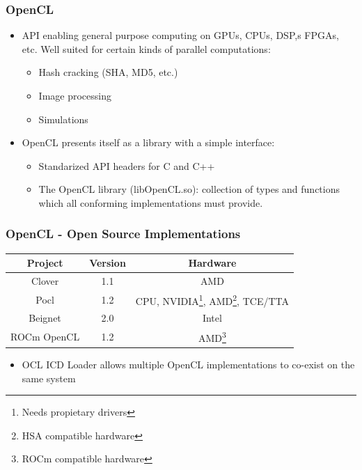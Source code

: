 \documentclass{beamer}
\begin{document}
\begin{frame}
\frametitle{OpenCL}
\begin{itemize}
  \item API enabling general purpose computing on GPUs, CPUs, DSP,s FPGAs, etc.
  Well suited for certain kinds of parallel computations:
  \begin{itemize}
    \item Hash cracking (SHA, MD5, etc.)
    \item Image processing
    \item Simulations
  \end{itemize}
  \item OpenCL presents itself as a library with a simple interface:
  \begin{itemize}
    \item Standarized API headers for C and C++
    \item The OpenCL library (libOpenCL.so): collection of types and functions
    which all conforming implementations must provide.
  \end{itemize}
\end{itemize}
\end{frame}

\begin{frame}
\frametitle{OpenCL - Open Source Implementations}
\centering
{
\begin{tabular}{c|c|c}
\textbf{Project} & \textbf{Version} & \textbf{Hardware} \\
\hline
Clover & 1.1 & AMD\\
Pocl & 1.2 & CPU, NVIDIA\footnote{Needs propietary drivers}, AMD\footnote{HSA
compatible hardware}, TCE/TTA\\
Beignet & 2.0 & Intel\\
ROCm OpenCL & 1.2 & AMD\footnote{ROCm compatible hardware}\\
\end{tabular}
}
\vfill
\begin{itemize}
  \item OCL ICD Loader allows multiple OpenCL implementations to co-exist on
  the same system
\end{itemize}
\end{frame}
\end{document}

